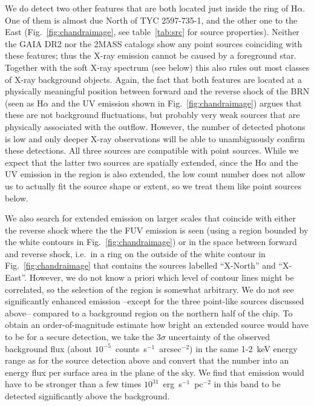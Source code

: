 \documentclass[linenumbers]{aastex631}
\begin{document}
We do detect two other features that are both located just inside the ring of H$\alpha$. One of them is almost due North of TYC 2597-735-1, and the other one to the East (Fig.~\ref{fig:chandraimage}, see table~\ref{tab:src} for source properties).  Neither the GAIA DR2 \citep{2016A&A...595A...1G,2018A&A...616A...1G} nor the 2MASS \citep{2006AJ....131.1163S} catalogs show any point sources coinciding with these features; thus the X-ray emission cannot be caused by a foreground star. Together with the soft X-ray spectrum (see below) this also rules out most classes of X-ray background objects. Again, the fact that both features are located at a physically meaningful position between forward and the reverse shock of the BRN (seen as H$\alpha$ and the UV emission shown in Fig.~\ref{fig:chandraimage}) argues that these are not background fluctuations, but probably very weak sources that are physically associated with the outflow. However, the number of detected photons is low and only deeper X-ray observations will be able to unambiguously confirm these detections.
All three sources are compatible with point sources. While we expect that the latter two sources are spatially extended, since the H$\alpha$ and the UV emission in the region is also extended, the low count number does not allow us to actually fit the source shape or extent, so we treat them like point sources below.

We also search for extended emission on larger scales that coincide with either the reverse shock where the the FUV emission is seen (using a region bounded by the white contours  in Fig.~\ref{fig:chandraimage}) or in the space between forward and reverse shock, i.e.\ in a ring on the outside of the white contour in Fig.~\ref{fig:chandraimage} that contains the sources labelled ``X-North'' and ``X-East''. However, we do not know a priori which level of contour lines might be correlated, so the selection of the region is somewhat arbitrary. We do not see significantly enhanced emission --except for the three point-like sources discussed above-- compared to a background region on the northern half of the chip. To obtain an order-of-magnitude estimate how bright an extended source would have to be for a secure detection, we take the $3\sigma$ uncertainty of the observed background flux (about $10^{-5}$~counts~s$^{-1}$~arcsec$^{-2}$) in the same 1-2~keV energy range as for the source detection above and convert that the number into an energy flux per surface area in the plane of the sky. We find that emission would have to be stronger than a few times $10^{31}$~erg~s$^{-1}$~pc$^{-2}$ in this band to be detected significantly above the background.
\end{document}
